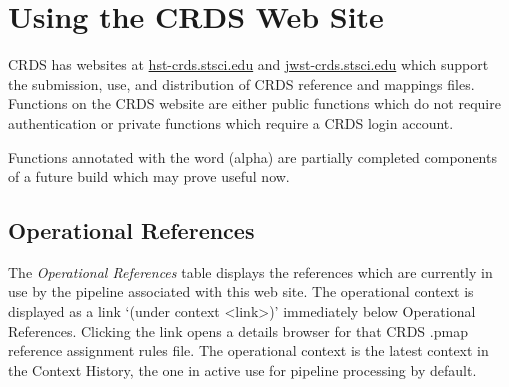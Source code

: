 \documentclass[letterpaper,10pt,english]{sphinxmanual}
\begin{document}
\chapter{Using the CRDS Web Site}
\label{web_site_use::doc}\label{web_site_use:using-the-crds-web-site}
CRDS has websites at \href{http://hst-crds.stsci.edu/}{hst-crds.stsci.edu} and \href{http://jwst-crds.stsci.edu/}{jwst-crds.stsci.edu} which support the submission, use,
and distribution of CRDS reference and mappings files.   Functions on the CRDS
website are either public functions which do not require authentication or private
functions which require a CRDS login account.
\begin{figure}[htbp]
\centering

\label{web_site_use:jwst-crds-stsci-edu}\end{figure}

Functions annotated with the word (alpha) are partially completed components of
a future build which may prove useful now.


\section{Operational References}
\label{web_site_use:operational-references}
The \emph{Operational References} table displays the references which are currently in use
by the pipeline associated with this web site.   The operational context is displayed
as a link `(under context \textless{}link\textgreater{})' immediately below Operational References.  Clicking
the link opens a details browser for that CRDS .pmap reference assignment rules file.
The operational context is the latest context in the Context History,  the one in
active use for pipeline processing by default.
\end{document}
